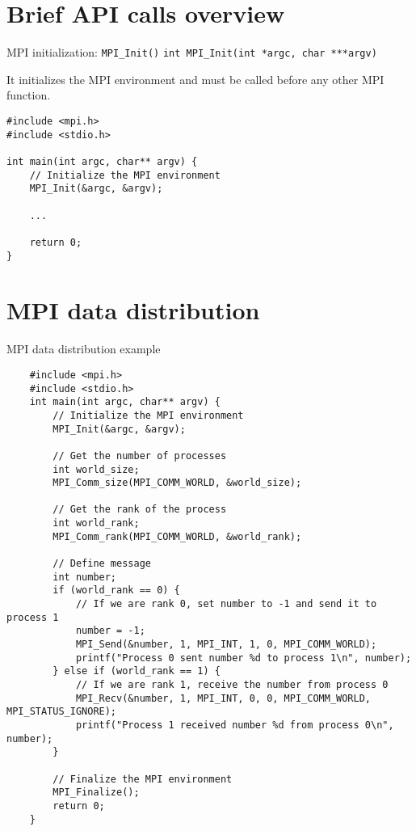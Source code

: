 \documentclass{beamer}
\begin{document}
\section{Brief API calls overview}

\begin{frame}[fragile]{MPI initialization: \texttt{MPI\_Init()}}
  \texttt{int MPI\_Init(int *argc, char ***argv)}

  It initializes the MPI environment and must be called before any other MPI function.

  \lstset{style=CStyle, caption=Basic application written using MPI}
  \begin{lstlisting}
#include <mpi.h>
#include <stdio.h>

int main(int argc, char** argv) {
    // Initialize the MPI environment
    MPI_Init(&argc, &argv);

    ...

    return 0;
}
  \end{lstlisting}

\end{frame}

\section{MPI data distribution}

\begin{frame}[fragile]{MPI data distribution example}
  \lstset{style=CStyle, caption=MPI data distribution example}
  \begin{lstlisting}
    #include <mpi.h>
    #include <stdio.h>
    int main(int argc, char** argv) {
        // Initialize the MPI environment
        MPI_Init(&argc, &argv);
    
        // Get the number of processes
        int world_size;
        MPI_Comm_size(MPI_COMM_WORLD, &world_size);
    
        // Get the rank of the process
        int world_rank;
        MPI_Comm_rank(MPI_COMM_WORLD, &world_rank);
    
        // Define message
        int number;
        if (world_rank == 0) {
            // If we are rank 0, set number to -1 and send it to process 1
            number = -1;
            MPI_Send(&number, 1, MPI_INT, 1, 0, MPI_COMM_WORLD);
            printf("Process 0 sent number %d to process 1\n", number);
        } else if (world_rank == 1) {
            // If we are rank 1, receive the number from process 0
            MPI_Recv(&number, 1, MPI_INT, 0, 0, MPI_COMM_WORLD, MPI_STATUS_IGNORE);
            printf("Process 1 received number %d from process 0\n", number);
        }
    
        // Finalize the MPI environment
        MPI_Finalize();
        return 0;
    }
  \end{lstlisting}

\end{frame}
\end{document}
